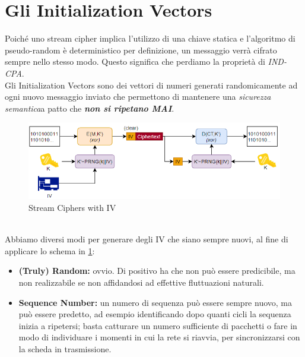 \section{Gli Initialization Vectors}
Poiché uno stream cipher implica l'utilizzo di una chiave statica e l'algoritmo di pseudo-random è deterministico per definizione, un messaggio verrà cifrato sempre nello stesso modo. Questo significa che perdiamo la proprietà di \textit{IND-CPA}.\\
Gli Initialization Vectors sono dei vettori di numeri generati randomicamente ad ogni nuovo messaggio inviato che permettono di mantenere una \textit{sicurezza semantica}\footnotemark  a patto che \textbf{\textit{non si ripetano MAI}}.
\begin{figure}[ht]
    \centering
    \includegraphics[width=\textwidth]{image/streamIV.png}
    \caption{Stream Ciphers with IV}
    \label{fig:streamiv}
\end{figure}\\
Abbiamo diversi modi per generare degli IV che siano sempre nuovi, al fine di applicare lo schema in \cref{fig:streamiv}:

\begin{itemize}
    \item \textbf{(Truly) Random:} ovvio. Di positivo ha che non può essere predicibile, ma non realizzabile se non affidandosi ad effettive fluttuazioni naturali.
    \item \textbf{Sequence Number:} un numero di sequenza può essere sempre nuovo, ma può essere predetto, ad esempio identificando dopo quanti cicli la sequenza inizia a ripetersi; basta catturare un numero sufficiente di pacchetti o fare in modo di individuare i momenti in cui la rete si riavvia, per sincronizzarsi con la scheda in trasmissione.
\end{itemize}

